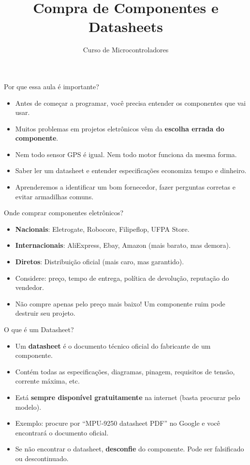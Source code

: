 \documentclass[10pt]{beamer}
\title{Compra de Componentes e Datasheets}
\subtitle{Curso de Microcontroladores}
\author{}
\date{}
\begin{document}
\begin{frame}
  \titlepage
\end{frame}

\begin{frame}{Por que essa aula é importante?}
  \begin{itemize}
    \item Antes de começar a programar, você precisa entender os componentes que vai usar.
    \item Muitos problemas em projetos eletrônicos vêm da \textbf{escolha errada do componente}.
    \item Nem todo sensor GPS é igual. Nem todo motor funciona da mesma forma.
    \item Saber ler um datasheet e entender especificações economiza tempo e dinheiro.
    \item Aprenderemos a identificar um bom fornecedor, fazer perguntas corretas e evitar armadilhas comuns.
  \end{itemize}
\end{frame}

\begin{frame}{Onde comprar componentes eletrônicos?}
  \begin{itemize}
    \item \textbf{Nacionais}: Eletrogate, Robocore, Filipeflop, UFPA Store.
    \item \textbf{Internacionais}: AliExpress, Ebay, Amazon (mais barato, mas demora).
    \item \textbf{Diretos}: Distribuição oficial (mais caro, mas garantido).
    \item Considere: preço, tempo de entrega, política de devolução, reputação do vendedor.
    \item Não compre apenas pelo preço mais baixo! Um componente ruim pode destruir seu projeto.
  \end{itemize}
\end{frame}

\begin{frame}{O que é um Datasheet?}
  \begin{itemize}
    \item Um \textbf{datasheet} é o documento técnico oficial do fabricante de um componente.
    \item Contém todas as especificações, diagramas, pinagem, requisitos de tensão, corrente máxima, etc.
    \item Está \textbf{sempre disponível gratuitamente} na internet (basta procurar pelo modelo).
    \item Exemplo: procure por ``MPU-9250 datasheet PDF'' no Google e você encontrará o documento oficial.
    \item Se não encontrar o datasheet, \textbf{desconfie} do componente. Pode ser falsificado ou descontinuado.
  \end{itemize}
\end{frame}
\end{document}
